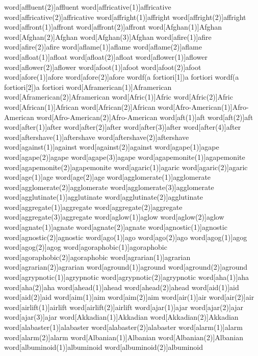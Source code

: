word[affluent(2)]{affluent}
word[affricative(1)]{affricative}
word[affricative(2)]{affricative}
word[affright(1)]{affright}
word[affright(2)]{affright}
word[affront(1)]{affront}
word[affront(2)]{affront}
word[Afghan(1)]{Afghan}
word[Afghan(2)]{Afghan}
word[Afghan(3)]{Afghan}
word[afire(1)]{afire}
word[afire(2)]{afire}
word[aflame(1)]{aflame}
word[aflame(2)]{aflame}
word[afloat(1)]{afloat}
word[afloat(2)]{afloat}
word[aflower(1)]{aflower}
word[aflower(2)]{aflower}
word[afoot(1)]{afoot}
word[afoot(2)]{afoot}
word[afore(1)]{afore}
word[afore(2)]{afore}
wordf(a fortiori[1]){a fortiori}
wordf(a fortiori[2]){a fortiori}
word[Aframerican(1)]{Aframerican}
word[Aframerican(2)]{Aframerican}
word[Afric(1)]{Afric}
word[Afric(2)]{Afric}
word[African(1)]{African}
word[African(2)]{African}
word[Afro-American(1)]{Afro-American}
word[Afro-American(2)]{Afro-American}
word[aft(1)]{aft}
word[aft(2)]{aft}
word[after(1)]{after}
word[after(2)]{after}
word[after(3)]{after}
word[after(4)]{after}
word[aftershave(1)]{aftershave}
word[aftershave(2)]{aftershave}
word[against(1)]{against}
word[against(2)]{against}
word[agape(1)]{agape}
word[agape(2)]{agape}
word[agape(3)]{agape}
word[agapemonite(1)]{agapemonite}
word[agapemonite(2)]{agapemonite}
word[agaric(1)]{agaric}
word[agaric(2)]{agaric}
word[age(1)]{age}
word[age(2)]{age}
word[agglomerate(1)]{agglomerate}
word[agglomerate(2)]{agglomerate}
word[agglomerate(3)]{agglomerate}
word[agglutinate(1)]{agglutinate}
word[agglutinate(2)]{agglutinate}
word[aggregate(1)]{aggregate}
word[aggregate(2)]{aggregate}
word[aggregate(3)]{aggregate}
word[aglow(1)]{aglow}
word[aglow(2)]{aglow}
word[agnate(1)]{agnate}
word[agnate(2)]{agnate}
word[agnostic(1)]{agnostic}
word[agnostic(2)]{agnostic}
word[ago(1)]{ago}
word[ago(2)]{ago}
word[agog(1)]{agog}
word[agog(2)]{agog}
word[agoraphobic(1)]{agoraphobic}
word[agoraphobic(2)]{agoraphobic}
word[agrarian(1)]{agrarian}
word[agrarian(2)]{agrarian}
word[aground(1)]{aground}
word[aground(2)]{aground}
word[agrypnotic(1)]{agrypnotic}
word[agrypnotic(2)]{agrypnotic}
word[aha(1)]{aha}
word[aha(2)]{aha}
word[ahead(1)]{ahead}
word[ahead(2)]{ahead}
word[aid(1)]{aid}
word[aid(2)]{aid}
word[aim(1)]{aim}
word[aim(2)]{aim}
word[air(1)]{air}
word[air(2)]{air}
word[airlift(1)]{airlift}
word[airlift(2)]{airlift}
word[ajar(1)]{ajar}
word[ajar(2)]{ajar}
word[ajar(3)]{ajar}
word[Akkadian(1)]{Akkadian}
word[Akkadian(2)]{Akkadian}
word[alabaster(1)]{alabaster}
word[alabaster(2)]{alabaster}
word[alarm(1)]{alarm}
word[alarm(2)]{alarm}
word[Albanian(1)]{Albanian}
word[Albanian(2)]{Albanian}
word[albuminoid(1)]{albuminoid}
word[albuminoid(2)]{albuminoid}
